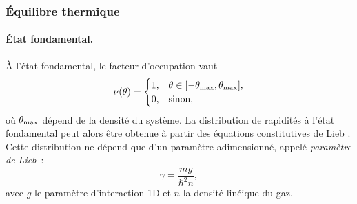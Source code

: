 %



\subsubsection{Équilibre thermique}

\paragraph{État fondamental.}

À l’état fondamental,  le facteur d’occupation vaut
\begin{equation}
	\nu(\theta) = 
	\begin{cases}
		1, & \theta \in [-\theta_{\tiny \mathrm{max}}, \theta_{\tiny \mathrm{max}}], \\
		0, & \text{sinon},
	\end{cases}	
\end{equation}
où $\theta_{\tiny \mathrm{max}}$ dépend de la densité du système. La distribution de rapidités à l’état fondamental peut alors être obtenue à partir des équations constitutives de Lieb \cite{LL_1963_1}. Cette distribution ne dépend que d’un paramètre adimensionné, appelé \emph{paramètre de Lieb} :
\begin{equation}\label{chap2:eq:gamma.1}
\gamma = \frac{mg}{\hbar^2 n}, 
\end{equation}
avec $g$ le paramètre d’interaction 1D et $n$ la densité linéique du gaz.

